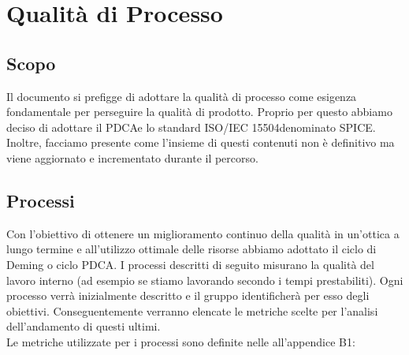 \section{Qualità di Processo}
\subsection{Scopo}
Il documento si prefigge di adottare la qualità di processo come esigenza fondamentale per perseguire la qualità di prodotto. Proprio per questo abbiamo deciso di adottare il PDCA\pedice e lo standard ISO/IEC 15504\pedice denominato SPICE. Inoltre, facciamo presente come l'insieme di questi contenuti non è definitivo ma viene aggiornato e incrementato durante il percorso.
\subsection{Processi}
Con l'obiettivo di ottenere un miglioramento continuo della qualità in un'ottica a lungo termine e all'utilizzo ottimale delle risorse abbiamo adottato il ciclo di Deming o ciclo PDCA.\newline
I processi descritti di seguito misurano la qualità del lavoro interno (ad esempio se stiamo lavorando secondo i tempi prestabiliti).
Ogni processo verrà inizialmente descritto e il gruppo identificherà per esso degli obiettivi. Conseguentemente verranno elencate le metriche scelte per l'analisi dell'andamento di questi ultimi. \\
Le metriche utilizzate per i processi sono definite nelle \NdP all'appendice B1:
\newpage

